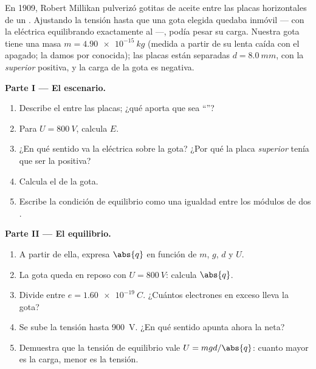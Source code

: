 \begin{problem}
\label{pb:g11:electric-gravitational-fields:1}
En 1909, Robert Millikan pulverizó gotitas de aceite entre las placas
horizontales de un . Ajustando la tensión hasta que una gota
elegida quedaba inmóvil --- con la  eléctrica equilibrando
exactamente al  ---, podía pesar su carga. Nuestra gota tiene una
masa $m = \qty{4.90e-15}{kg}$ (medida a partir de su lenta caída con el
 apagado; la damos por conocida); las placas están separadas
$d = \qty{8.0}{mm}$, con la \emph{superior} positiva, y la carga de la
gota es negativa.

\medskip
\noindent\textbf{Parte I --- El escenario.}
\begin{enumerate}
  \item Describe el  entre las placas; ¿qué aporta que sea
        ``''?
  \item Para $U = \qty{800}{V}$, calcula $E$.
  \item ¿En qué sentido va la  eléctrica sobre la gota? ¿Por qué
        la placa \emph{superior} tenía que ser la positiva?
  \item Calcula el  de la gota.
  \item Escribe la condición de equilibrio como una igualdad entre los
        módulos de dos .
\end{enumerate}

\medskip
\noindent\textbf{Parte II --- El equilibrio.}
\begin{enumerate}[resume]
  \item A partir de ella, expresa $\abs{q}$ en función de $m$, $g$, $d$
        y $U$.
  \item La gota queda en reposo con $U = \qty{800}{V}$: calcula
        $\abs{q}$.
  \item Divide entre $e = \qty{1.60e-19}{C}$. ¿Cuántos electrones en
        exceso lleva la gota?
  \item Se sube la tensión hasta \qty{900}{V}. ¿En qué sentido apunta
        ahora la  neta?
  \item Demuestra que la tensión de equilibrio vale
        $U = mgd/\abs{q}$: cuanto mayor es la carga, menor es la
        tensión.
\end{enumerate}


\end{problem}
